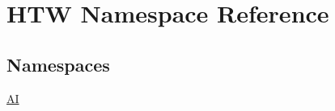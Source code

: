 \hypertarget{namespace_h_t_w}{\section{H\-T\-W Namespace Reference}
\label{namespace_h_t_w}
}
\subsection*{Namespaces}
\begin{DoxyCompactItemize}
\item 
\hyperlink{namespace_h_t_w_1_1_a_i}{A\-I}
\end{DoxyCompactItemize}
